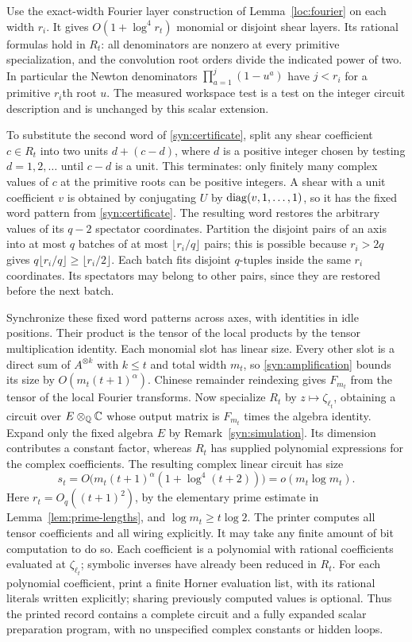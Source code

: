 Use the exact-width Fourier layer construction of Lemma~\ref{loc:fourier}
on each width $r_i$.  It gives $O(1+\log^4 r_t)$ monomial or disjoint
shear layers.  Its rational formulas hold in $R_t$: all denominators
are nonzero at every primitive specialization, and the convolution
root orders divide the indicated power of two.  In particular the
Newton denominators $\prod_{a=1}^j(1-u^a)$ have $j<r_i$ for a
primitive $r_i$th root $u$.  The measured workspace test is a test on
the integer circuit description and is unchanged by this scalar
extension.

To substitute the second word of \eqref{syn:certificate}, split any
shear coefficient $c\in R_t$ into two units $d+(c-d)$, where $d$ is
a positive integer chosen by testing $d=1,2,\ldots$ until $c-d$ is a
unit.  This terminates: only finitely many complex values of $c$ at
the primitive roots can be positive integers.  A shear with a unit
coefficient $v$ is obtained by conjugating $U$ by
$\operatorname{diag}(v,1,\ldots,1)$, so it has the fixed word pattern from
\eqref{syn:certificate}.  The resulting word restores the arbitrary values of
its $q-2$ spectator coordinates.  Partition the disjoint pairs of an
axis into at most $q$ batches of at most $\lfloor r_i/q\rfloor$ pairs;
this is possible because $r_i>2q$ gives
$q\lfloor r_i/q\rfloor\ge\lfloor r_i/2\rfloor$.
Each batch fits disjoint $q$-tuples inside the same $r_i$ coordinates.
Its spectators may belong to other pairs, since they are restored
before the next batch.

Synchronize these fixed word patterns across axes, with identities
in idle positions.  Their product is the tensor of the local products
by the tensor multiplication identity.  Each monomial slot has linear
size.  Every other slot is a direct sum of $A^{\otimes k}$ with
$k\le t$ and total width $m_t$, so \eqref{syn:amplification} bounds
its size by $O(m_t(t+1)^\alpha)$.  Chinese remainder reindexing gives
$F_{m_t}$ from the tensor of the local Fourier transforms.
Now specialize $R_t$ by $z\mapsto\zeta_{\ell_t}$, obtaining a circuit
over $E\otimes_{\mathbb Q}\mathbb C$ whose output matrix is $F_{m_t}$ times the
algebra identity.  Expand only the fixed algebra $E$ by
Remark~\ref{syn:simulation}.  Its dimension contributes a constant
factor, whereas $R_t$ has supplied polynomial expressions for the
complex coefficients.  The resulting complex linear circuit has size
\begin{equation}\label{syn:radix-size}
 s_t=O\bigl(m_t(t+1)^\alpha(1+\log^4(t+2))\bigr)
     =o(m_t\log m_t).
\end{equation}
Here $r_t=O_q((t+1)^2)$, by the elementary prime estimate in
Lemma~\ref{lem:prime-lengths}, and $\log m_t\ge t\log2$.  The printer computes all
tensor coefficients and all wiring explicitly.  It may take any
finite amount of bit computation to do so.  Each coefficient is a
polynomial with rational coefficients evaluated at
$\zeta_{\ell_t}$; symbolic inverses have already been reduced in
$R_t$.  For each polynomial coefficient, print a finite Horner evaluation list,
with its rational literals written explicitly; sharing previously computed
values is optional.  Thus the printed record contains a complete circuit
and a fully expanded scalar preparation program, with no unspecified
complex constants or hidden loops.

